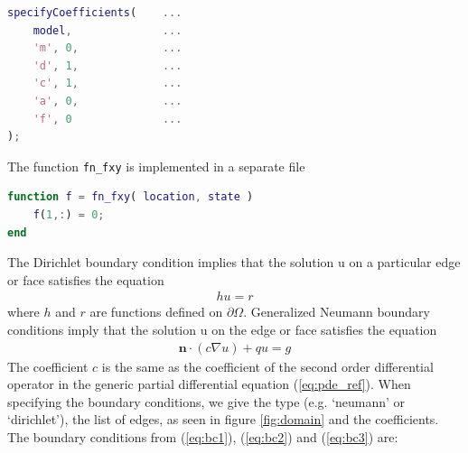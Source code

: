 \documentclass[11pt, a4paper]{article}
\begin{document}
\begin{lstlisting}[language=Matlab]
%% Specify the PDE model
specifyCoefficients(    ...
    model,              ...
    'm', 0,             ...
    'd', 1,             ...
    'c', 1,             ...
    'a', 0,             ...
    'f', 0              ...
);
\end{lstlisting}
The function \texttt{fn\_fxy} is implemented in a separate file

\begin{lstlisting}[language=Matlab]
%% file: fn_fxy.m
function f = fn_fxy( location, state )
    f(1,:) = 0;
end
\end{lstlisting}

The Dirichlet boundary condition implies that the solution u on a particular edge or face satisfies the equation
\begin{align}
	hu = r
\end{align}
where $h$ and $r$ are functions defined on $\partial \Omega$. Generalized Neumann boundary conditions imply that the solution u on the edge or face satisfies the equation
\begin{align}
\textbf{n}\cdot (c\nabla u) + qu = g	
\end{align}
The coefficient $c$ is the same as the coefficient of the second order differential operator in the generic partial differential equation (\ref{eq:pde_ref}). When specifying the boundary conditions, we give the type (e.g. `neumann' or `dirichlet'), the list of edges, as seen in figure \ref{fig:domain} and the coefficients. The boundary conditions from (\ref{eq:bc1}), (\ref{eq:bc2}) and (\ref{eq:bc3}) are:
\end{document}
